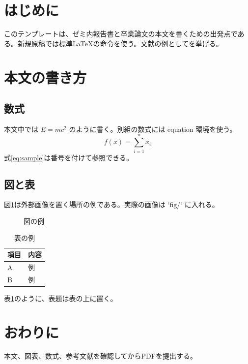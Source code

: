 \section{はじめに}
このテンプレートは、ゼミ内報告書と卒業論文の本文を書くための出発点である。新規原稿では標準LaTeXの命令を使う。文献の例として\cite{latexcompanion,knuth}を挙げる。

\section{本文の書き方}
\subsection{数式}
本文中では $E=mc^2$ のように書く。別組の数式には equation 環境を使う。
\begin{equation}
  f(x)=\sum_{i=1}^{n} x_i
\label{eq:sample}
\end{equation}
式\ref{eq:sample}は番号を付けて参照できる。

\subsection{図と表}
図\ref{fig:sample}は外部画像を置く場所の例である。実際の画像は `fig/` に入れる。
\begin{figure}[tb]
  \centering
  \fbox{\rule{0pt}{28mm}\rule{0.8\columnwidth}{0pt}}
  \caption{図の例}
  \label{fig:sample}
\end{figure}

\begin{table}[tb]
  \centering
  \caption{表の例}
  \label{tab:sample}
  \begin{tabular}{ll}
    \hline
    項目 & 内容 \\
    \hline
    A & 例 \\
    B & 例 \\
    \hline
  \end{tabular}
\end{table}

表\ref{tab:sample}のように、表題は表の上に置く。

\section{おわりに}
本文、図表、数式、参考文献を確認してからPDFを提出する。
